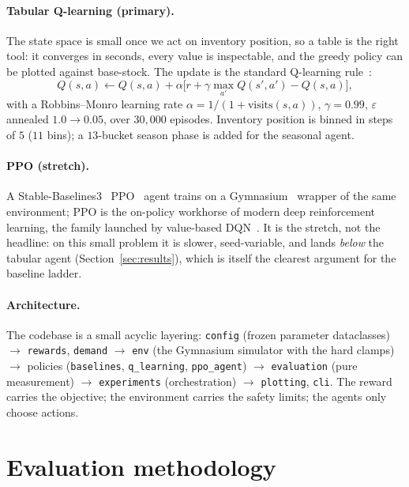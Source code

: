 \documentclass[11pt]{article}
\begin{document}
\paragraph{Tabular Q-learning (primary).}
The state space is small once we act on inventory position, so a table is the right tool: it
converges in seconds, every value is inspectable, and the greedy policy can be plotted against
base-stock. The update is the standard Q-learning rule~\cite{suttonbarto}:
\begin{equation}
  Q(s,a) \leftarrow Q(s,a) + \alpha\big[r + \gamma \max_{a'} Q(s',a') - Q(s,a)\big],
\end{equation}
with a Robbins--Monro learning rate $\alpha = 1/(1+\text{visits}(s,a))$, $\gamma=0.99$,
$\varepsilon$ annealed $1.0\!\to\!0.05$, over $30{,}000$ episodes. Inventory position is binned
in steps of $5$ ($11$ bins); a $13$-bucket season phase is added for the seasonal agent.

\paragraph{PPO (stretch).}
A Stable-Baselines3~\cite{sb3} PPO~\cite{ppo} agent trains on a Gymnasium~\cite{gymnasium} wrapper
of the same environment; PPO is the on-policy workhorse of modern deep reinforcement learning, the
family launched by value-based DQN~\cite{mnih}. It is the
stretch, not the headline: on this small problem it is slower, seed-variable, and lands
\emph{below} the tabular agent (Section~\ref{sec:results}), which is itself the clearest argument
for the baseline ladder.

\paragraph{Architecture.}
The codebase is a small acyclic layering: \texttt{config} (frozen parameter dataclasses)
$\rightarrow$ \texttt{rewards}, \texttt{demand} $\rightarrow$ \texttt{env} (the Gymnasium
simulator with the hard clamps) $\rightarrow$ policies (\texttt{baselines}, \texttt{q\_learning},
\texttt{ppo\_agent}) $\rightarrow$ \texttt{evaluation} (pure measurement) $\rightarrow$
\texttt{experiments} (orchestration) $\rightarrow$ \texttt{plotting}, \texttt{cli}. The reward
carries the objective; the environment carries the safety limits; the agents only choose actions.

\section{Evaluation methodology}
\label{sec:eval}
\end{document}
